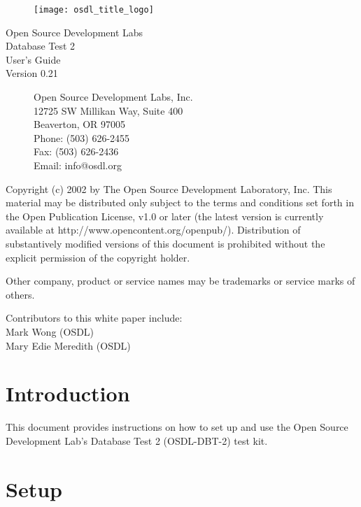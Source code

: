 \documentclass{article}
\begin{document}
\begin{titlepage}

\begin{figure}[t]
\centering
\texttt{[image: osdl\_title\_logo]}
\end{figure}

\centering
\huge
Open Source Development Labs \\
Database Test 2 \\
\Huge
User's Guide \\
\LARGE
Version 0.21

\begin{figure}[b]
\flushleft
\normalsize
Open Source Development Labs, Inc. \\
12725 SW Millikan Way, Suite 400 \\
Beaverton, OR 97005 \\
Phone: (503) 626-2455 \\
Fax: (503) 626-2436 \\
Email: info@osdl.org
\end{figure}

\end{titlepage}

\noindent
Copyright (c) 2002 by The Open Source Development Laboratory, Inc. This
material may be distributed only subject to the terms and conditions set forth
in the Open Publication License, v1.0 or later (the latest version is currently
available at http://www.opencontent.org/openpub/). Distribution of
substantively modified versions of this document is prohibited without the
explicit permission of the copyright holder.

\noindent
Other company, product or service names may be trademarks or service marks of
others.

\noindent
Contributors to this white paper include: \\
\indent Mark Wong (OSDL) \\
\indent Mary Edie Meredith (OSDL)

\pagebreak

\section{Introduction}

This document provides instructions on how to set up and use the Open Source
Development Lab's Database Test 2 (OSDL-DBT-2) test kit.

\section{Setup}
\end{document}
